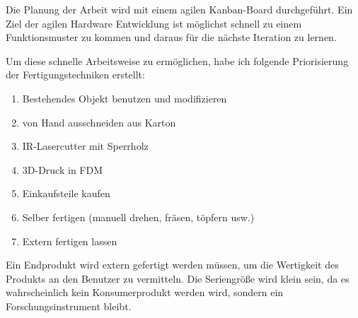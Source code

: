 

Die Planung der Arbeit wird mit einem agilen Kanban-Board durchgeführt. Ein Ziel der agilen Hardware Entwicklung ist möglichst schnell zu einem Funktionsmuster zu kommen und daraus für die nächste Iteration zu lernen.

Um diese schnelle Arbeitsweise zu ermöglichen, habe ich folgende Priorisierung der Fertigungstechniken erstellt:

\begin{enumerate}
\item Bestehendes Objekt benutzen und modifizieren
\item von Hand ausschneiden aus Karton
\item IR-Lasercutter mit Sperrholz
\item 3D-Druck in FDM
\item Einkaufsteile kaufen
\item Selber fertigen (manuell drehen, fräsen, töpfern usw.)
\item Extern fertigen lassen
\end{enumerate}

Ein Endprodukt wird extern gefertigt werden müssen, um die Wertigkeit des Produkts an den Benutzer zu vermitteln. Die Seriengröße wird klein sein, da es wahrscheinlich kein Konsumerprodukt werden wird, sondern ein Forschungsinstrument bleibt.
